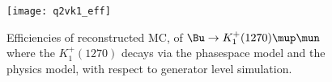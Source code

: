 



\begin{figure}[h]
  \begin{center}
    \texttt{[image: q2vk1\_eff]}
    \caption{\small Efficiencies of reconstructed MC, of $\Bu\to K_1^+(1270) \mup\mun$
      where the $K_1^+(1270)$ decays via the phasespace model and the physics model,
    with respect to generator level simulation.}
    \label{fig:q2vk1eff}
  \end{center}
\end{figure}



